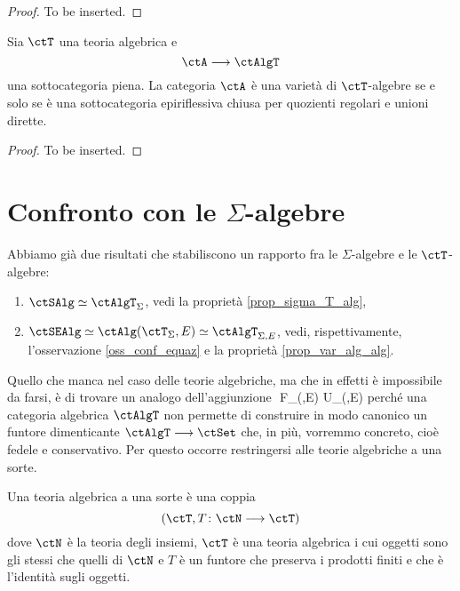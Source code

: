 \begin{proof}
	To be inserted.
\end{proof}

\begin{corollary}\label{cor_th_Birkhoff_AlgT}
	Sia \(\ctT\) una teoria algebrica e
	\[
		\ctA \fun \ctAlgT
	\]
	una sottocategoria piena. La categoria \(\ctA\) è una varietà di \(\ctT\)-algebre se e solo se è una sottocategoria epiriflessiva
	chiusa per quozienti regolari e unioni dirette.
\end{corollary}

\begin{proof}
	To be inserted.
\end{proof}

\section{Confronto con le \(\Sigma\)-algebre}\label{sec_confr_sigma_T}

Abbiamo già due risultati che stabiliscono un rapporto fra le \(\Sigma\)-algebre e le \(\ctT\)-algebre:
\begin{enumerate}
	\item \(\ctSAlg \simeq \ctAlgT_{\Sigma}\), vedi la proprietà \ref{prop_sigma_T_alg},
	\item \(\ctSEAlg \simeq \ctAlg(\ctT_{\Sigma},E) \simeq \ctAlgT_{\Sigma,E}\), vedi, rispettivamente, l'osservazione
	      \ref{oss_conf_equaz} e la proprietà \ref{prop_var_alg_alg}.
\end{enumerate}

Quello che manca nel caso delle teorie algebriche, ma che in effetti è impossibile da farsi, è di trovare un analogo
dell'aggiunzione
\(\)
\;\;\;\;\;\; F_{(\Sigma,E)} \dashv U_{(\Sigma,E)}\(\)
perché una categoria algebrica \(\ctAlgT\) non permette di construire in modo canonico un funtore dimenticante
\(\ctAlgT \fun \ctSet\) che, in più, vorremmo concreto, cioè fedele e conservativo. Per questo occorre restringersi alle
teorie algebriche a una sorte.

\begin{definition}\label{def_th_alg_unasorte}
	Una teoria algebrica a una sorte è una coppia
	\[
		(\ctT, T \colon \ctN \fun \ctT)
	\]
	dove \(\ctN\) è la teoria degli insiemi, \(\ctT\) è una teoria algebrica i cui oggetti sono gli stessi che quelli di \(\ctN\) e \(T\)
	è un funtore che preserva i prodotti finiti e che è l'identità sugli oggetti.
\end{definition}

